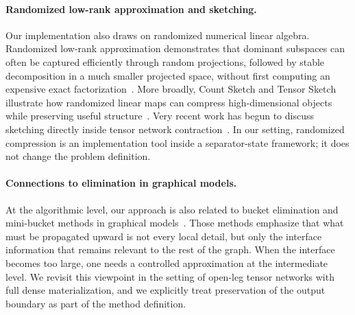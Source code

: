 \paragraph{Randomized low-rank approximation and sketching.}
Our implementation also draws on randomized numerical linear algebra. Randomized low-rank approximation demonstrates that dominant subspaces can often be captured efficiently through random projections, followed by stable decomposition in a much smaller projected space, without first computing an expensive exact factorization~\cite{halko2011finding}. More broadly, Count Sketch and Tensor Sketch illustrate how randomized linear maps can compress high-dimensional objects while preserving useful structure~\cite{charikar2004finding,pham2013fast}. Very recent work has begun to discuss sketching directly inside tensor network contraction~\cite{heddes2026approximating}. In our setting, randomized compression is an implementation tool inside a separator-state framework; it does not change the problem definition.

\paragraph{Connections to elimination in graphical models.}
At the algorithmic level, our approach is also related to bucket elimination and mini-bucket methods in graphical models~\cite{dechter1996bucket,dechter1997mini}. Those methods emphasize that what must be propagated upward is not every local detail, but only the interface information that remains relevant to the rest of the graph. When the interface becomes too large, one needs a controlled approximation at the intermediate level. We revisit this viewpoint in the setting of open-leg tensor networks with full dense materialization, and we explicitly treat preservation of the output boundary as part of the method definition.

